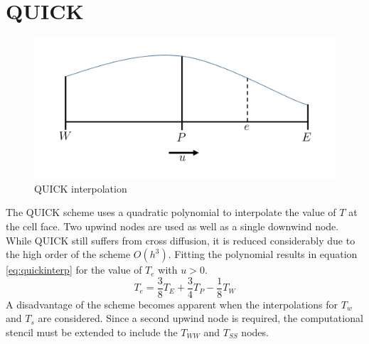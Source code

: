 \documentclass[12pt,twocolumn]{article}
\begin{document}
\section*{QUICK}
\begin{figure}
\includegraphics[width=\columnwidth]{plot/QUICK.png}
\footnotesize{\caption{QUICK interpolation}\label{fig:quick}}

\end{figure}
The QUICK scheme uses a quadratic polynomial to interpolate the value of $T$ at the cell face.
Two upwind nodes are used as well as a single downwind node.
While QUICK still suffers from cross diffusion, it is reduced considerably due to the high order of the scheme $O(h^3)$.
Fitting the polynomial results in equation \eqref{eq:quickinterp} for the value of $T_e$ with $u>0$.
\begin{equation}\label{eq:quickinterp}T_e = \frac{3}{8}T_E + \frac{3}{4}T_P - \frac{1}{8}T_W\end{equation}
A disadvantage of the scheme becomes apparent when the interpolations for $T_w$ and $T_s$ are considered.
Since a second upwind node is required, the computational stencil must be extended to include the $T_{WW}$ and $T_{SS}$ nodes.
\end{document}
